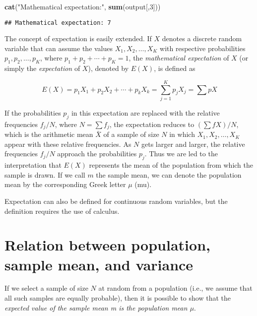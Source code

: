 \documentclass[
]{article}
\newenvironment{Shaded}{\begin{snugshade}}{\end{snugshade}}
\newcommand{\DecValTok}[1]{\textcolor[rgb]{0.00,0.00,0.81}{#1}}
\newcommand{\FunctionTok}[1]{\textcolor[rgb]{0.13,0.29,0.53}{\textbf{#1}}}
\newcommand{\NormalTok}[1]{#1}
\newcommand{\StringTok}[1]{\textcolor[rgb]{0.31,0.60,0.02}{#1}}
\begin{document}
\begin{Shaded}
\begin{Highlighting}[]
\FunctionTok{cat}\NormalTok{(}\StringTok{"Mathematical expectation:"}\NormalTok{, }\FunctionTok{sum}\NormalTok{(output[,}\DecValTok{3}\NormalTok{]))}
\end{Highlighting}
\end{Shaded}

\begin{verbatim}
## Mathematical expectation: 7
\end{verbatim}

The concept of expectation is easily extended. If \(X\) denotes a
discrete random variable that can assume the values
\(X_1, X_2, \ldots, X_K\) with respective probabilities
\(p_1, p_2, \ldots, p_K\), where \(p_1 + p_2 + \cdots + p_K = 1\), the
\emph{mathematical expectation} of \(X\) (or simply the
\emph{expectation} of \(X\)), denoted by \(E(X)\), is defined as

\begin{equation}
E(X) = p_1 X_1 + p_2 X_2 + \cdots + p_k X_k = \sum^K_{j=1}{p_j X_j} = \sum{pX}
\end{equation}

If the probabilities \(p_j\) in this expectation are replaced with the
relative frequencies \(f_j/N\), where \(N = \sum{f_j}\), the expectation
reduces to \((\sum{fX})/N\), which is the arithmetic mean \(\bar{X}\) of
a sample of size \(N\) in which \(X_1, X_2, \ldots, X_K\) appear with
these relative frequencies. As \(N\) gets larger and larger, the
relative frequencies \(f_j/N\) approach the probabilities \(p_j\). Thus
we are led to the interpretation that \(E(X)\) represents the mean of
the population from which the sample is drawn. If we call \(m\) the
sample mean, we can denote the population mean by the corresponding
Greek letter \(\mu\) (mu).

Expectation can also be defined for continuous random variables, but the
definition requires the use of calculus.

\hypertarget{relation-between-population-sample-mean-and-variance}{%
\section{Relation between population, sample mean, and
variance}\label{relation-between-population-sample-mean-and-variance}}

If we select a sample of size \(N\) at random from a population (i.e.,
we assume that all such samples are equally probable), then it is
possible to show that the \emph{expected value of the sample mean m is
the population mean \(\mu\)}.
\end{document}
